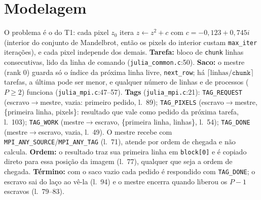 \documentclass[10pt,twocolumn,a4paper]{article}
\newcommand{\code}[1]{\texttt{#1}}
\newcommand{\lref}[2]{\code{#1}:#2}
\begin{document}

\begin{table}[t]
\centering\scriptsize
{}
\caption{Granularidade com $P=32$ (31 escravos), 10 execuções por linha: tempo total; tempo médio de
uma tarefa (ocupado/tarefas); ida e volta das mensagens de uma tarefa, sem cálculo, com escravos do nó
do mestre (intra) e do outro (inter); util.\ = fração do tempo em que os escravos calculam; cauda = do
primeiro escravo liberado ao fim.}
\label{tab:gran}
\end{table}

\section{Modelagem}
O problema é o do T1: cada pixel $z_0$ itera $z \leftarrow z^2 + c$ com $c=-0{,}123+0{,}745i$
(interior do conjunto de Mandelbrot, então os pixels do interior custam \code{max\_iter}
iterações), e cada pixel independe dos demais. \textbf{Tarefa:} bloco de \code{chunk} linhas
consecutivas, lido da linha de comando (\lref{julia\_common.c}{50}). \textbf{Saco:} o mestre
(rank 0) guarda só o índice da próxima linha livre, \code{next\_row}; há $\lceil
\text{linhas}/\code{chunk}\rceil$ tarefas, a última pode ser menor, e qualquer número de linhas e
de processos ($P\ge2$) funciona (\lref{julia\_mpi.c}{47--57}). \textbf{Tags}
(\lref{julia\_mpi.c}{21}): \code{TAG\_REQUEST} (escravo$\to$mestre, vazia: primeiro pedido, l.~89);
\code{TAG\_PIXELS} (escravo$\to$mestre, \{primeira linha, pixels\}: resultado que vale como pedido
da próxima tarefa, l.~103); \code{TAG\_WORK} (mestre$\to$escravo, \{primeira linha, linhas\},
l.~54); \code{TAG\_DONE} (mestre$\to$escravo, vazia, l.~49). O mestre recebe com
\code{MPI\_ANY\_SOURCE}/\code{MPI\_ANY\_TAG} (l.~71), atende por ordem de chegada e não calcula.
\textbf{Ordem:} o resultado traz sua primeira linha em \code{block[0]} e é copiado direto para essa
posição da imagem (l.~77), qualquer que seja a ordem de chegada. \textbf{Término:} com o saco vazio
cada pedido é respondido com \code{TAG\_DONE}; o escravo sai do laço ao vê-la (l.~94) e o mestre
encerra quando liberou os $P-1$ escravos (l.~79--83).
\end{document}

